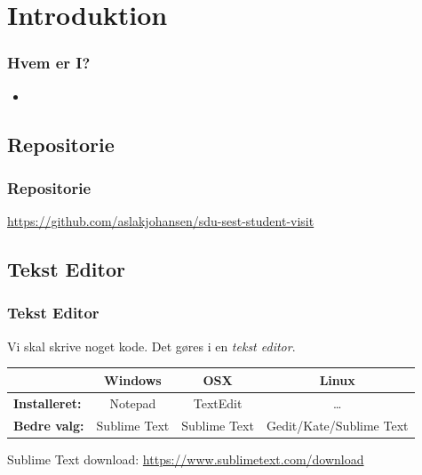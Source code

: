 \section{Introduktion}
\begin{frame}
    \frametitle{Hvem er I?}
    \begin{itemize}
      \item 
    \end{itemize}
\end{frame}

\subsection{Repositorie}
\begin{frame}
    \frametitle{Repositorie}
    \begin{center}
      \url{https://github.com/aslakjohansen/sdu-sest-student-visit}
    \end{center}
\end{frame}

\subsection{Tekst Editor}
\begin{frame}
    \frametitle{Tekst Editor}
    Vi skal skrive noget kode. Det gøres i en \textsl{tekst editor}.
    
    \vspace{1cm}
    \begin{center}
        \begin{tabular}{l|c|c|c|}
            \rowcolor{blue!25} \cellcolor{blue!0}
                                  & \textbf{Windows} & \textbf{OSX} & \textbf{Linux} \\
            \hline
            \rowcolor{blue!10} \cellcolor{blue!25}
            \textbf{Installeret:} & Notepad          & TextEdit     & \ldots \\
            \hline
            \rowcolor{blue!10} \cellcolor{blue!25}
            \textbf{Bedre valg:}  & Sublime Text     & Sublime Text & Gedit/Kate/Sublime Text \\
            \hline
        \end{tabular}
    \end{center}
    \vspace{1cm}
    
    Sublime Text download: \url{https://www.sublimetext.com/download}
\end{frame}

